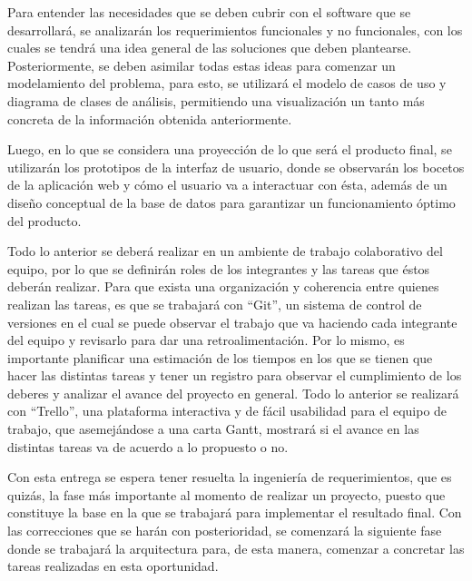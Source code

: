 \documentclass{memoria}
\begin{document}
Para entender las necesidades que se deben cubrir con el software que se desarrollará, se analizarán los requerimientos funcionales y no funcionales, con los cuales se tendrá una idea general de las soluciones que deben plantearse. Posteriormente, se deben asimilar todas estas ideas para comenzar un modelamiento del problema, para esto, se utilizará el modelo de casos de uso y diagrama de clases de análisis, permitiendo una visualización un tanto más concreta de la información obtenida anteriormente.

Luego, en lo que se considera una proyección de lo que será el producto final, se utilizarán los prototipos de la interfaz de usuario, donde se observarán los bocetos de la aplicación web y cómo el usuario va a interactuar con ésta, además de un diseño conceptual de la base de datos para garantizar un funcionamiento óptimo del producto.
 
Todo lo anterior se deberá realizar en un ambiente de trabajo colaborativo del equipo, por lo que se definirán roles de los integrantes y las tareas que éstos deberán realizar. Para que exista una organización y coherencia entre quienes realizan las tareas, es que se trabajará con “Git”, un sistema de control de versiones en el cual se puede observar el trabajo que va haciendo cada integrante del equipo y revisarlo para dar una retroalimentación. Por lo mismo, es importante planificar una estimación de los tiempos en los que se tienen que hacer las distintas tareas y tener un registro para observar el cumplimiento de los deberes y analizar el avance del proyecto en general. Todo lo anterior se realizará con “Trello”, una plataforma interactiva y de fácil usabilidad para el equipo de trabajo, que asemejándose a una carta Gantt, mostrará si el avance en las distintas tareas va de acuerdo a lo propuesto o no.

Con esta entrega se espera tener resuelta la ingeniería de requerimientos, que es quizás, la fase más importante al momento de realizar un proyecto, puesto que constituye la base en la que se trabajará para implementar el resultado final. Con las correcciones que se harán con posterioridad, se comenzará la siguiente fase donde se trabajará la arquitectura para, de esta manera, comenzar a concretar las tareas realizadas en esta oportunidad.   




\end{document}
